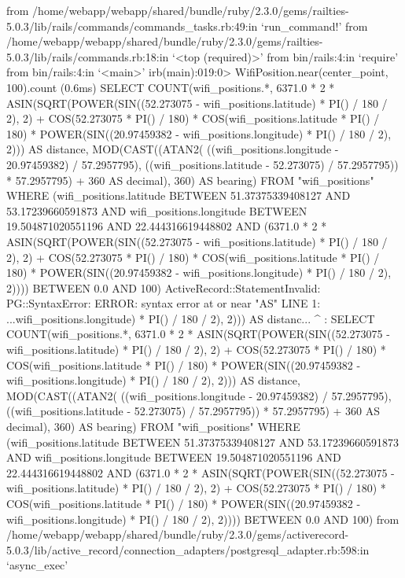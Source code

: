         from /home/webapp/webapp/shared/bundle/ruby/2.3.0/gems/railties-5.0.3/lib/rails/commands/commands_tasks.rb:49:in `run_command!'
        from /home/webapp/webapp/shared/bundle/ruby/2.3.0/gems/railties-5.0.3/lib/rails/commands.rb:18:in `<top (required)>'
        from bin/rails:4:in `require'
        from bin/rails:4:in `<main>'
irb(main):019:0> WifiPosition.near(center_point, 100).count
   (0.6ms)  SELECT COUNT(wifi_positions.*, 6371.0 * 2 * ASIN(SQRT(POWER(SIN((52.273075 - wifi_positions.latitude) * PI() / 180 / 2), 2) + COS(52.273075 * PI() / 180) * COS(wifi_positions.latitude * PI() / 180) * POWER(SIN((20.97459382 - wifi_positions.longitude) * PI() / 180 / 2), 2))) AS distance, MOD(CAST((ATAN2( ((wifi_positions.longitude - 20.97459382) / 57.2957795), ((wifi_positions.latitude - 52.273075) / 57.2957795)) * 57.2957795) + 360 AS decimal), 360) AS bearing) FROM "wifi_positions" WHERE (wifi_positions.latitude BETWEEN 51.37375339408127 AND 53.17239660591873 AND wifi_positions.longitude BETWEEN 19.504871020551196 AND 22.444316619448802 AND (6371.0 * 2 * ASIN(SQRT(POWER(SIN((52.273075 - wifi_positions.latitude) * PI() / 180 / 2), 2) + COS(52.273075 * PI() / 180) * COS(wifi_positions.latitude * PI() / 180) * POWER(SIN((20.97459382 - wifi_positions.longitude) * PI() / 180 / 2), 2)))) BETWEEN 0.0 AND 100)
ActiveRecord::StatementInvalid: PG::SyntaxError: ERROR:  syntax error at or near "AS"
LINE 1: ...wifi_positions.longitude) * PI() / 180 / 2), 2))) AS distanc...
                                                             ^
: SELECT COUNT(wifi_positions.*, 6371.0 * 2 * ASIN(SQRT(POWER(SIN((52.273075 - wifi_positions.latitude) * PI() / 180 / 2), 2) + COS(52.273075 * PI() / 180) * COS(wifi_positions.latitude * PI() / 180) * POWER(SIN((20.97459382 - wifi_positions.longitude) * PI() / 180 / 2), 2))) AS distance, MOD(CAST((ATAN2( ((wifi_positions.longitude - 20.97459382) / 57.2957795), ((wifi_positions.latitude - 52.273075) / 57.2957795)) * 57.2957795) + 360 AS decimal), 360) AS bearing) FROM "wifi_positions" WHERE (wifi_positions.latitude BETWEEN 51.37375339408127 AND 53.17239660591873 AND wifi_positions.longitude BETWEEN 19.504871020551196 AND 22.444316619448802 AND (6371.0 * 2 * ASIN(SQRT(POWER(SIN((52.273075 - wifi_positions.latitude) * PI() / 180 / 2), 2) + COS(52.273075 * PI() / 180) * COS(wifi_positions.latitude * PI() / 180) * POWER(SIN((20.97459382 - wifi_positions.longitude) * PI() / 180 / 2), 2)))) BETWEEN 0.0 AND 100)
        from /home/webapp/webapp/shared/bundle/ruby/2.3.0/gems/activerecord-5.0.3/lib/active_record/connection_adapters/postgresql_adapter.rb:598:in `async_exec'
